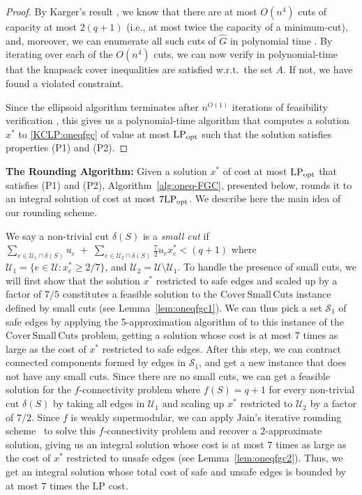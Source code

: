 \documentclass[11pt]{article}
\newcommand\lpopt{\hbox{\text{LP}$_{\text{opt}}$}}
\newcommand{\safe}{\mathscr{S}}
\newcommand{\unsafe}{\mathscr{U}}
\newcommand\hG{\hat{G}}
\newcommand\ASC{\mathrm{Cover\,Small\,Cuts}}
\begin{document}
{\begin{proof}
{
By Karger's result \cite{Karger93}, we know that there are at most $O(n^4)$ cuts of capacity at most $2(q+1)$ (i.e., at most twice the capacity of a minimum-cut), and, moreover, we can enumerate all such cuts of $\hG$ in polynomial time \cite{NNI97}.
}
By iterating over each of the $O(n^4)$ cuts, we can now verify in polynomial-time that the knapsack cover inequalities are satisfied w.r.t.\ the set $A$. If not, we have found a violated constraint.

Since the ellipsoid algorithm terminates after {$n^{O(1)}$} iterations of feasibility verification \cite{ellipsoid-book}, this gives us a polynomial-time algorithm that computes a solution $x^*$ to \eqref{KCLP:oneqfgc} of value at most $\lpopt$ such that the solution satisfies properties (P1) and (P2). 
\end{proof}



\noindent
{\bf The Rounding Algorithm:}
Given a solution $x^*$ of cost at most $\lpopt$ that satisfies (P1) and (P2), Algorithm~\ref{alg:oneq-FGC}, presented below, rounds it to an integral solution of cost at most $7\lpopt$. We describe here the main idea of our rounding scheme. 

We say a non-trivial cut $\delta(S)$ is a {\em small cut} if $\sum_{e\in \unsafe_1\cap\delta(S)}u_e \;+\; \sum_{e\in \unsafe_2\cap\delta(S)}\frac{7}{2} u_ex^*_e < (q+1)$ where $\unsafe_{1} = \{e\in \unsafe : x^*_e \geq 2/7\}$, and $\unsafe_{2} = \unsafe \setminus \unsafe_1$.
To handle the presence of small cuts, we will first show that the solution $x^*$ restricted to safe edges and scaled up by a factor of $7/5$ constitutes a feasible solution to the $\ASC$ instance defined by small cuts (see Lemma~\ref{lem:oneqfgc1}). We can thus pick a set $\safe_1$ of safe edges by applying the 5-approximation algorithm of \cite{B2023,BCGI24} to this instance of the $\ASC$ problem, getting a solution whose cost is at most $7$ {times} as large as the cost of $x^*$ restricted to safe edges. After this step, we can contract connected components formed by edges in $\safe_1$, and get a new instance that does not have any small cuts. 
Since there are no small cuts, we can get a feasible solution for the $f$-connectivity problem where $f(S) = q+1$ for every non-trivial cut $\delta(S)$ by 
taking all edges in $\unsafe_1$ and scaling up $x^*$ restricted to $\unsafe_2$ by a factor of $7/2$.
Since $f$ is weakly supermodular, we can apply Jain's iterative rounding scheme~\cite{Jain01} to solve this $f$-connectivity problem and recover a $2$-approximate solution, giving us an integral solution whose cost is at most $7$ {times} as large as the cost of $x^*$ restricted to unsafe edges (see Lemma~\ref{lem:oneqfgc2}).
Thus, we get an integral solution whose total cost of safe and unsafe edges is bounded by at most $7$ times the LP cost.

}
\end{document}
